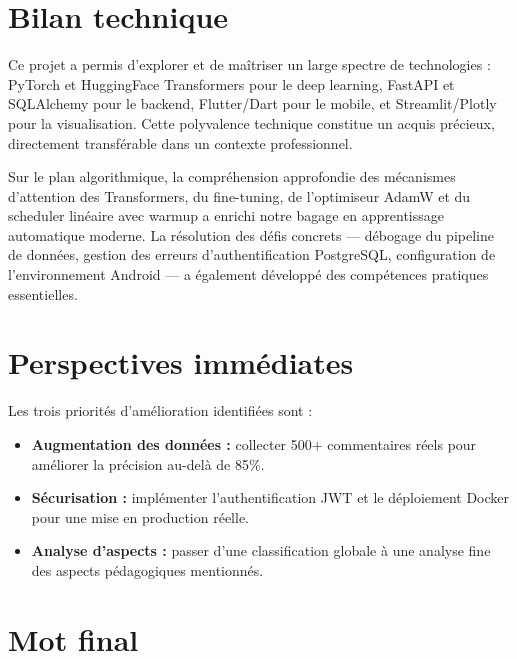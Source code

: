 \vspace{0.5cm}

\section*{Bilan technique}

Ce projet a permis d'explorer et de maîtriser un large spectre de
technologies : PyTorch et HuggingFace Transformers pour le deep learning,
FastAPI et SQLAlchemy pour le backend, Flutter/Dart pour le mobile, et
Streamlit/Plotly pour la visualisation. Cette polyvalence technique
constitue un acquis précieux, directement transférable dans un contexte
professionnel.

Sur le plan algorithmique, la compréhension approfondie des mécanismes
d'attention des Transformers, du fine-tuning, de l'optimiseur AdamW et
du scheduler linéaire avec warmup a enrichi notre bagage en apprentissage
automatique moderne. La résolution des défis concrets — débogage du
pipeline de données, gestion des erreurs d'authentification PostgreSQL,
configuration de l'environnement Android — a également développé
des compétences pratiques essentielles.

\vspace{0.5cm}

\section*{Perspectives immédiates}

Les trois priorités d'amélioration identifiées sont :
\begin{itemize}
  \item \textbf{Augmentation des données :} collecter 500+ commentaires
        réels pour améliorer la précision au-delà de 85\%.
  \item \textbf{Sécurisation :} implémenter l'authentification JWT et le
        déploiement Docker pour une mise en production réelle.
  \item \textbf{Analyse d'aspects :} passer d'une classification globale
        à une analyse fine des aspects pédagogiques mentionnés.
\end{itemize}

\vspace{0.5cm}

\section*{Mot final}

